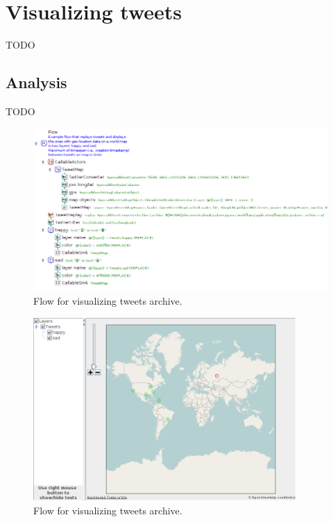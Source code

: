 \documentclass[a4paper,10pt]{book}
\begin{document}
\clearpage
\newpage
\section{Visualizing tweets}
TODO

\subsection{Analysis}
TODO

\begin{figure}[htb]
  \centering
  \includegraphics[width=12.0cm]{images/visualize_tweets-archive-flow.png}
  \caption{Flow for visualizing tweets archive.}
  \label{visualize_tweets-archive-flow}
\end{figure}

\begin{figure}[htb]
  \centering
  \includegraphics[width=10.0cm]{images/visualize_tweets-archive-output.png}
  \caption{Flow for visualizing tweets archive.}
  \label{visualize_tweets-archive-output}
\end{figure}
\end{document}
